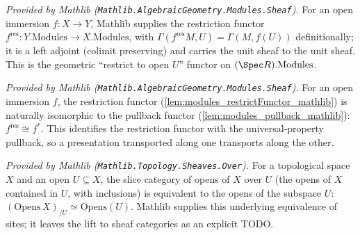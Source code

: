 \begin{lemma}
  \label{lem:modules_restrictFunctor_mathlib}
  \mathlibok
  \textit{Provided by Mathlib (\texttt{Mathlib.AlgebraicGeometry.Modules.Sheaf}).}
  For an open immersion \(f : X \to Y\), Mathlib supplies the restriction functor
  \(f^{\mathrm{res}} : Y.\mathrm{Modules} \to X.\mathrm{Modules}\), with
  \(\Gamma(f^{\mathrm{res}} M, U) = \Gamma(M, f(U))\) definitionally; it is a left adjoint (colimit
  preserving) and carries the unit sheaf to the unit sheaf. This is the geometric
  ``restrict to open \(U\)'' functor on \((\Spec R).\mathrm{Modules}\).
\end{lemma}

\begin{lemma}
  \label{lem:modules_restrictFunctorIsoPullback_mathlib}
  \mathlibok
  \textit{Provided by Mathlib (\texttt{Mathlib.AlgebraicGeometry.Modules.Sheaf}).}
  For an open immersion \(f\), the restriction functor (\cref{lem:modules_restrictFunctor_mathlib})
  is naturally isomorphic to the pullback functor (\cref{lem:modules_pullback_mathlib}):
  \(f^{\mathrm{res}} \cong f^{*}\). This identifies the restriction functor with the
  universal-property pullback, so a presentation transported along one transports along the other.
\end{lemma}






\begin{lemma}
  \label{lem:opens_overEquivalence_mathlib}
  \mathlibok
  \textit{Provided by Mathlib (\texttt{Mathlib.Topology.Sheaves.Over}).}
  For a topological space \(X\) and an open \(U \subseteq X\), the slice category of opens of
  \(X\) over \(U\) (the opens of \(X\) contained in \(U\), with inclusions) is equivalent to the
  opens of the subspace \(U\):
  \((\mathrm{Opens}\,X)_{/U} \simeq \mathrm{Opens}(U)\). Mathlib supplies this underlying
  equivalence of sites; it leaves the lift to sheaf categories as an explicit TODO.
\end{lemma}

